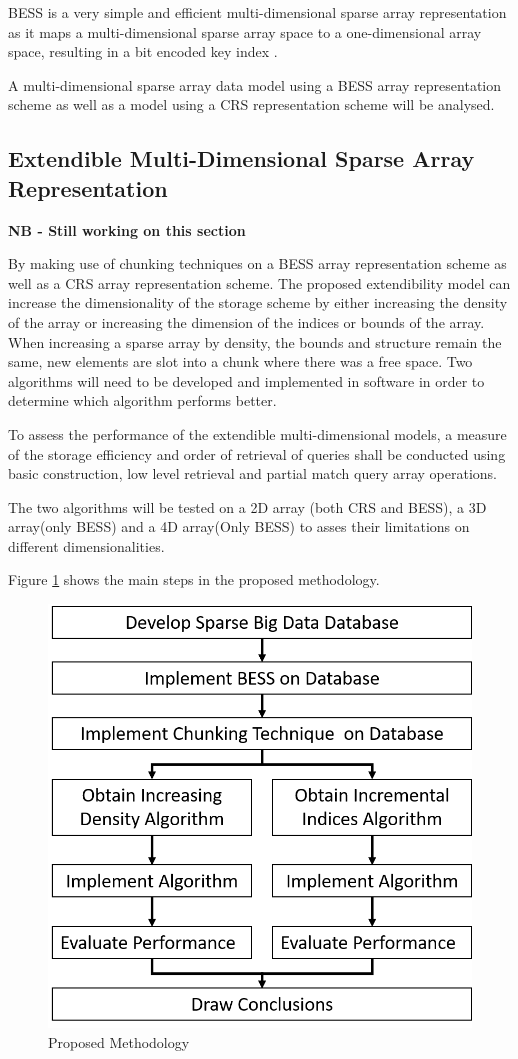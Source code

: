 BESS is a very simple and efficient multi-dimensional sparse array representation as it maps a multi-dimensional sparse array space to a one-dimensional array space, resulting in a bit encoded key index \cite{wang:2014sar}.

A multi-dimensional sparse array data model using a BESS array representation scheme as well as a model using a CRS representation scheme will be analysed.

\subsection{Extendible Multi-Dimensional Sparse Array Representation}

\textbf{NB - Still working on this section}

 By making use of chunking techniques on a BESS array representation scheme as well as a CRS array representation scheme. The proposed extendibility model can increase the dimensionality of the storage scheme by either increasing the density of the array or increasing the dimension  of the indices or bounds of the array. When increasing a sparse array by density, the bounds and structure remain the same, new elements are slot into a chunk where there was a free space. Two algorithms will need to be developed and implemented in software in order to determine which algorithm performs better.
 
 To assess the performance of the extendible multi-dimensional models, a measure of the storage efficiency and order of retrieval of queries shall be conducted using basic construction, low level retrieval and partial match query array operations.
 
 The two algorithms will be tested on a 2D array (both CRS and BESS), a 3D array(only BESS) and a 4D array(Only BESS) to asses their limitations on different dimensionalities.
 
 Figure \ref{fig:proposedmethod} shows the main steps in the proposed methodology.

 
 \begin{figure}
 	\centering
 	\includegraphics[width=0.7\linewidth]{proposedMethod}
 	\caption{Proposed Methodology}
 	\label{fig:proposedmethod}
 \end{figure}
 